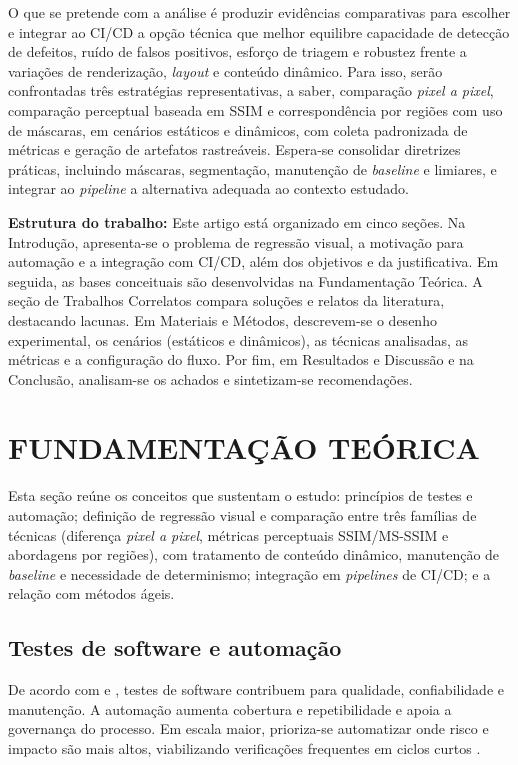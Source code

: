 \documentclass{UNESC}
\begin{document}
O que se pretende com a análise é produzir evidências comparativas para escolher e integrar ao CI/CD a opção técnica que melhor equilibre capacidade de detecção de defeitos, ruído de falsos positivos, esforço de triagem e robustez frente a variações de renderização, \emph{layout} e conteúdo dinâmico. Para isso, serão confrontadas três estratégias representativas, a saber, comparação \emph{pixel a pixel}, comparação perceptual baseada em SSIM e correspondência por regiões com uso de máscaras, em cenários estáticos e dinâmicos, com coleta padronizada de métricas e geração de artefatos rastreáveis. Espera-se consolidar diretrizes práticas, incluindo máscaras, segmentação, manutenção de \emph{baseline} e limiares, e integrar ao \emph{pipeline} a alternativa adequada ao contexto estudado.

\vspace{0.5em}
\noindent
\textbf{Estrutura do trabalho:} Este artigo está organizado em cinco seções. Na Introdução, apresenta-se o problema de regressão visual, a motivação para automação e a integração com CI/CD, além dos objetivos e da justificativa. Em seguida, as bases conceituais são desenvolvidas na Fundamentação Teórica. A seção de Trabalhos Correlatos compara soluções e relatos da literatura, destacando lacunas. Em Materiais e Métodos, descrevem-se o desenho experimental, os cenários (estáticos e dinâmicos), as técnicas analisadas, as métricas e a configuração do fluxo. Por fim, em Resultados e Discussão e na Conclusão, analisam-se os achados e sintetizam-se recomendações.


\section{FUNDAMENTAÇÃO TEÓRICA}

Esta seção reúne os conceitos que sustentam o estudo: princípios de testes e automação; definição de regressão visual e comparação entre três famílias de técnicas (diferença \emph{pixel a pixel}, métricas perceptuais SSIM/MS-SSIM e abordagens por regiões), com tratamento de conteúdo dinâmico, manutenção de \emph{baseline} e necessidade de determinismo; integração em \emph{pipelines} de CI/CD; e a relação com métodos ágeis.

\subsection{Testes de software e automação}

De acordo com  e , testes de software contribuem para qualidade, confiabilidade e manutenção. A automação aumenta cobertura e repetibilidade e apoia a governança do processo. Em escala maior, prioriza-se automatizar onde risco e impacto são mais altos, viabilizando verificações frequentes em ciclos curtos \cite{costa2022}.
\end{document}
